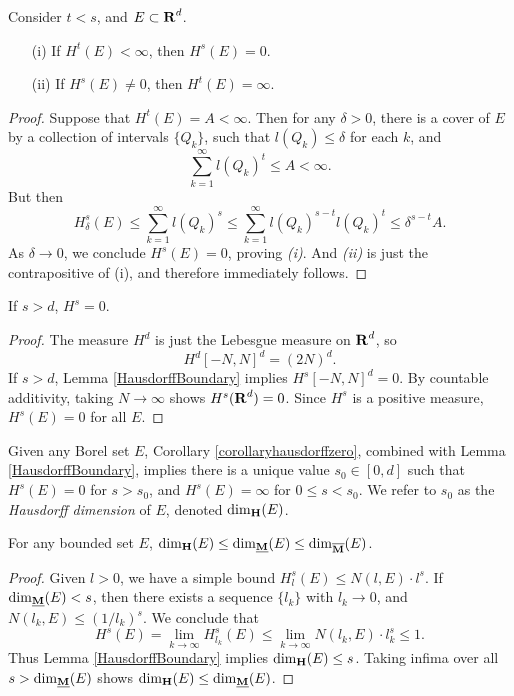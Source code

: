 \begin{lemma} \label{HausdorffBoundary}
	Consider $t < s$, and $E \subset \operatorname{\mathbf{R}}^d$.
	\begin{enumerate}
		\item[(i)] If $H^t(E) < \infty$, then $H^s(E) = 0$.
		\item[(ii)] If $H^s(E) \neq 0$, then $H^t(E) = \infty$.
	\end{enumerate}
\end{lemma}
\begin{proof}
	Suppose that $H^t(E) = A < \infty$. Then for any $\delta > 0$, there is a cover of $E$ by a collection of intervals $\{ Q_k \}$, such that $l(Q_k) \leq \delta$ for each $k$, and
	\[ \sum_{k = 1}^\infty l(Q_k)^t \leq A < \infty. \]
	But then
	\[ H^s_\delta(E) \leq \sum_{k = 1}^\infty l(Q_k)^s \leq \sum_{k = 1}^\infty l(Q_k)^{s-t} l(Q_k)^t \leq \delta^{s-t} A. \]
	As $\delta \to 0$, we conclude $H^s(E) = 0$, proving \emph{(i)}. And \emph{(ii)} is just the contrapositive of (i), and therefore immediately follows.
\end{proof}

\begin{corollary} \label{corollaryhausdorffzero}
	If $s > d$, $H^s = 0$.
\end{corollary}
\begin{proof}
	The measure $H^d$ is just the Lebesgue measure on $\operatorname{\mathbf{R}}^d$, so
	\[ H^d[-N,N]^d = (2N)^d. \]
	If $s > d$, Lemma \ref{HausdorffBoundary} implies $H^s[-N,N]^d = 0$. By countable additivity, taking $N \to \infty$ shows $H^s(\operatorname{\mathbf{R}}^d) = 0$. Since $H^s$ is a positive measure, $H^s(E) = 0$ for all $E$.
\end{proof}

Given any Borel set $E$, Corollary \ref{corollaryhausdorffzero}, combined with Lemma \ref{HausdorffBoundary}, implies there is a unique value $s_0 \in [0,d]$ such that $H^s(E) = 0$ for $s > s_0$, and $H^s(E) = \infty$ for $0 \leq s < s_0$. We refer to $s_0$ as the \emph{Hausdorff dimension} of $E$, denoted $\operatorname{\dim_{\mathbf{H}}}(E)$.

\begin{theorem}
	For any bounded set $E$, $\operatorname{\dim_{\mathbf{H}}}(E) \leq \operatorname{\dim_{\underline{\mathbf{M}}}}(E) \leq \operatorname{\dim_{\overline{\mathbf{M}}}}(E)$.
\end{theorem}
\begin{proof}
	Given $l > 0$, we have a simple bound $H^s_l(E) \leq N(l,E) \cdot l^s$. If $\operatorname{\dim_{\underline{\mathbf{M}}}}(E) < s$, then there exists a sequence $\{ l_k \}$ with $l_k \to 0$, and $N(l_k,E) \leq (1/l_k)^s$. We conclude that
	\[ H^s(E) = \lim_{k \to \infty} H^s_{l_k}(E) \leq \lim_{k \to \infty} N(l_k,E) \cdot l_k^s \leq 1. \]
	Thus Lemma \ref{HausdorffBoundary} implies $\operatorname{\dim_{\mathbf{H}}}(E) \leq s$. Taking infima over all $s > \operatorname{\dim_{\underline{\mathbf{M}}}}(E)$ shows $\operatorname{\dim_{\mathbf{H}}}(E) \leq \operatorname{\dim_{\underline{\mathbf{M}}}}(E)$.
\end{proof}

